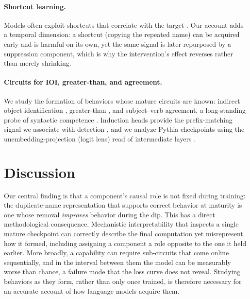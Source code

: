 \documentclass[11pt]{article}
\begin{document}
\paragraph{Shortcut learning.}
Models often exploit shortcuts that correlate with the target
\citep{geirhos2020shortcut}. Our account adds a temporal dimension: a shortcut
(copying the repeated name) can be acquired early and is harmful on its own, yet
the same signal is later repurposed by a suppression component, which is why the
intervention's effect reverses rather than merely shrinking.

\paragraph{Circuits for IOI, greater-than, and agreement.}
We study the formation of behaviors whose mature circuits are known: indirect
object identification \citep{wang2023ioi}, greater-than \citep{hanna2023greater},
and subject--verb agreement, a long-standing probe of syntactic competence
\citep{linzen2016assessing,marvin2018targeted}. Induction heads provide the
prefix-matching signal we associate with detection \citep{elhage2021mathematical,
olsson2022induction}, and we analyze Pythia checkpoints \citep{biderman2023pythia}
using the unembedding-projection (logit lens) read of intermediate layers
\citep{nostalgebraist2020logitlens}.

\section{Discussion}
Our central finding is that a component's causal role is not fixed during
training: the duplicate-name representation that supports correct
behavior at maturity is one whose removal \emph{improves} behavior during the
dip. This has a direct methodological consequence. Mechanistic interpretability
that inspects a single mature checkpoint can correctly describe the final
computation yet misrepresent how it formed, including assigning a component a
role opposite to the one it held earlier. More broadly, a capability can require
sub-circuits that come online sequentially, and in the interval between them the
model can be measurably worse than chance, a failure mode that the loss curve
does not reveal. Studying behaviors as they form, rather than only once trained,
is therefore necessary for an accurate account of how language models acquire
them.
\end{document}
